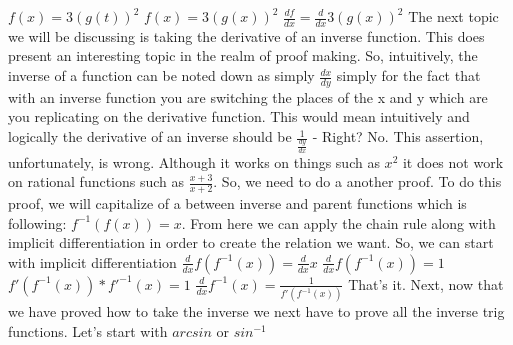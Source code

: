\documentclass{article}
\begin{document}
$f(x) = 3(g(t))^2$
\newline
\newline
$f(x) = 3(g(x))^2$
\newline
\newline
$\frac{df}{dx} = \frac{d}{dx}3(g(x))^2$
\newline
\newline
The next topic we will be discussing is taking the derivative of an inverse function. This does present an interesting topic in the realm of proof making. So, intuitively, the inverse of a function can be noted down as simply $\frac{dx}{dy}$ simply for the fact that with an inverse function you are switching the places of the x and y which are you replicating on the derivative function. This would mean intuitively and logically the derivative of an inverse should be $\frac{1}{\frac{dy}{dx}}$ - Right? No. This assertion, unfortunately, is wrong. Although it works on things such as $x^2$ it does not work on rational functions such as $\frac{x+3}{x+2}$. So, we need to do a another proof. 
\newline
\newline
To do this proof, we will capitalize of a between inverse and parent functions which is following: $f^{-1}(f(x)) = x$. From here we can apply the chain rule along with implicit differentiation in order to create the relation we want.
\newline
\newline
So, we can start with implicit differentiation
\newline
\newline
$\frac{d}{dx}f(f^{-1}(x)) = \frac{d}{dx}x$
\newline
\newline
$\frac{d}{dx}f(f^{-1}(x)) = 1$
\newline
\newline
$f'(f^{-1}(x))*f'^{-1}(x) = 1$
\newline
\newline
$ \frac{d}{dx}f^{-1}(x) = \frac{1}{f'(f^{-1}(x))}$
\newline
\newline
That's it. Next, now that we have proved how to take the inverse we next have to prove all the inverse trig functions. Let's start with $arcsin$ or $sin^{-1}$
\newline
\newline
\end{document}
